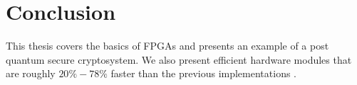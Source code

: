 \chapter{Conclusion\label{conclusion}}
This thesis covers the basics of FPGAs and presents an example of a post
quantum secure cryptosystem. We also present efficient hardware modules that
are roughly $20\% - 78\%$ faster than the previous implementations
\citep{FPGA_Post_Quantum_Primitives}.
